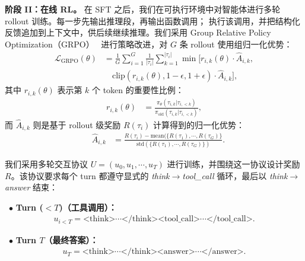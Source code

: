 \noindent \textbf{阶段 II：在线 RL。}
在 SFT 之后，我们在可执行环境中对智能体进行多轮 rollout 训练。每一步先输出推理段，再输出函数调用；\env{} 执行该调用，并把结构化反馈追加到上下文中，供后续继续推理。我们采用 Group Relative Policy Optimization（GRPO）~\cite{shao2024deepseekmath} 进行策略改进，对 $G$ 条 rollout 使用组归一化优势：
\begin{equation*}
    \begin{aligned}
        \mathcal{L}_{\text{GRPO}}(\theta)&=\frac{1}{G}\sum_{i=1}^G\frac{1}{|\tau_i|}\sum_{k=1}^{|\tau_i|}\min[r_{i,k}(\theta)\cdot\hat{A}_{i,k},\\
        &\quad\text{clip}(r_{i,k}(\theta),1-\epsilon,1+\epsilon)\cdot\hat{A}_{i,k}],
    \end{aligned}
\end{equation*}
其中 $r_{i,k}(\theta)$ 表示第 $k$ 个 token 的重要性比例：
\begin{equation*}
    \begin{aligned}
        r_{i,k}(\theta)&=\frac{\pi_\theta(\tau_{i,k}|\tau_{i,<k})}{\pi_{\text{old}}(\tau_{i,k}|\tau_{i,<k})},
    \end{aligned}
\end{equation*}
而 $\hat{A}_{i,k}$ 则是基于 rollout 级奖励 $R(\tau_i)$ 计算得到的归一化优势：
\begin{equation*}
    \begin{aligned}
        \quad \hat{A}_{i,k}&=\frac{R(\tau_i)-\text{mean}(\{R(\tau_1),\cdots,R(\tau_G)\}}{\text{std}(\{R(\tau_1),\cdots,R(\tau_G)\})}.
    \end{aligned}
\end{equation*}

我们采用多轮交互协议 $U=(u_0,u_1,\cdots,u_{T})$ 进行训练，并围绕这一协议设计奖励 $R$。该协议要求每个 turn 都遵守显式的 \textit{think}$\rightarrow$\textit{tool\_call} 循环，最后以 \textit{think}$\rightarrow$\textit{answer} 结束：

\noindent~$\bullet$ \textbf{Turn ($<T$)（工具调用）：}
\begin{equation*}
    \begin{aligned} u_{i<T}=\text{<think>}\cdots\text{</think>}\text{<tool\_call>}\cdots\text{</tool\_call>}.
    \end{aligned}
\end{equation*}

\noindent~$\bullet$ \textbf{Turn $T$（最终答案）：}
\begin{equation*}
    \begin{aligned}
u_T=\text{<think>}\cdots\text{</think>}\text{<answer>}\cdots\text{</answer>}.
    \end{aligned}
\end{equation*}

